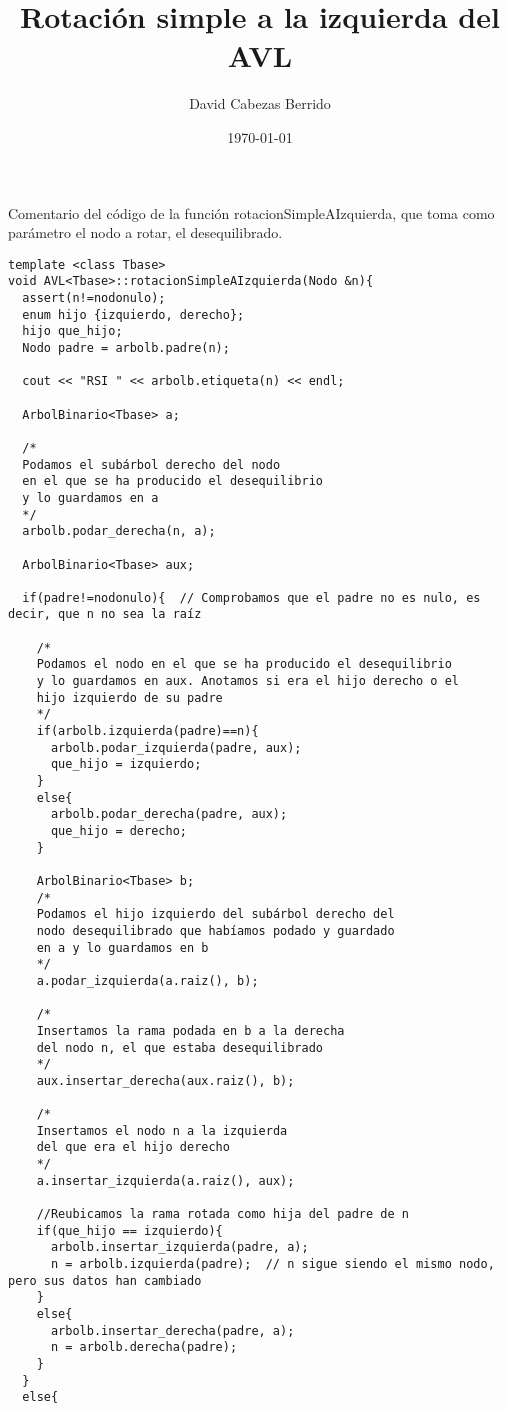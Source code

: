 \documentclass{article}
\begin{document}
\title{Rotación simple a la izquierda del AVL}
\author{David Cabezas Berrido}
\date{\today}
\maketitle

\begin{justify}
  Comentario del código de la función rotacionSimpleAIzquierda,
  que toma como parámetro el nodo a rotar, el desequilibrado.
\end{justify}

\begin{verbatim}
template <class Tbase>
void AVL<Tbase>::rotacionSimpleAIzquierda(Nodo &n){
  assert(n!=nodonulo);
  enum hijo {izquierdo, derecho};
  hijo que_hijo;
  Nodo padre = arbolb.padre(n);
  
  cout << "RSI " << arbolb.etiqueta(n) << endl;
  
  ArbolBinario<Tbase> a;

  /*
  Podamos el subárbol derecho del nodo
  en el que se ha producido el desequilibrio
  y lo guardamos en a
  */
  arbolb.podar_derecha(n, a);
  
  ArbolBinario<Tbase> aux;
  
  if(padre!=nodonulo){  // Comprobamos que el padre no es nulo, es decir, que n no sea la raíz
    
    /*
    Podamos el nodo en el que se ha producido el desequilibrio
    y lo guardamos en aux. Anotamos si era el hijo derecho o el 
    hijo izquierdo de su padre
    */
    if(arbolb.izquierda(padre)==n){    
      arbolb.podar_izquierda(padre, aux);
      que_hijo = izquierdo;
    }
    else{
      arbolb.podar_derecha(padre, aux);
      que_hijo = derecho;
    }
    
    ArbolBinario<Tbase> b;
    /*
    Podamos el hijo izquierdo del subárbol derecho del
    nodo desequilibrado que habíamos podado y guardado
    en a y lo guardamos en b
    */
    a.podar_izquierda(a.raiz(), b);

    /*
    Insertamos la rama podada en b a la derecha
    del nodo n, el que estaba desequilibrado
    */
    aux.insertar_derecha(aux.raiz(), b);
    
    /*
    Insertamos el nodo n a la izquierda 
    del que era el hijo derecho
    */
    a.insertar_izquierda(a.raiz(), aux);
    
    //Reubicamos la rama rotada como hija del padre de n
    if(que_hijo == izquierdo){
      arbolb.insertar_izquierda(padre, a);
      n = arbolb.izquierda(padre);  // n sigue siendo el mismo nodo, pero sus datos han cambiado
    }
    else{
      arbolb.insertar_derecha(padre, a);
      n = arbolb.derecha(padre);
    }
  }
  else{
    

\end{verbatim}
\end{document}

